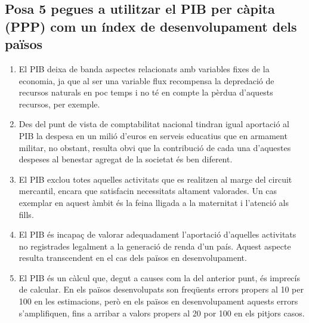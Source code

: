 \subsection{Posa 5 pegues a utilitzar el PIB per càpita (PPP) com un índex
de desenvolupament dels països}

\begin{enumerate}

  \item El PIB deixa de banda
  aspectes relacionats amb variables fixes de la economia, ja
  que al ser una variable flux recompensa la depredació de recursos naturals
  en poc temps i no té en compte la pèrdua d'aquests recursos, per exemple.
  
  \item Des del punt de vista de comptabilitat nacional tindran 
  igual aportació al PIB la despesa en un
  milió d’euros en serveis educatius que en armament militar, no obstant, 
  resulta obvi que la contribució de cada
  una d’aquestes despeses al benestar agregat de la societat és ben diferent. 
  
  \item El PIB exclou totes aquelles activitats que es realitzen al marge del 
  circuit mercantil,
  encara que satisfacin necessitats altament valorades. Un cas exemplar
  en aquest àmbit és la feina lligada a la maternitat i l’atenció als fills.
  
  \item El PIB és incapaç de valorar adequadament l’aportació d’aquelles activitats
  no registrades legalment a la generació de renda d’un país. 
  Aquest aspecte resulta transcendent en el cas dels països en 
  desenvolupament.
  
  \item El PIB és un càlcul que, degut a causes com la del anterior punt, és 
  imprecís de calcular. 
  En els països desenvolupats son freqüents errors propers al 10 per 100 en 
  les estimacions, però en els països en desenvolupament aquests errors 
  s’amplifiquen, fins a arribar a valors propers al 20 por 100 en els 
  pitjors casos.

\end{enumerate}
